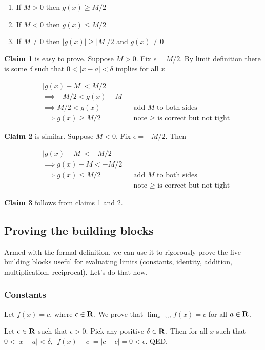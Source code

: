 \begin{enumerate}
    \item If $M>0$ then $g(x)\geq M/2$
    \item If $M<0$ then $g(x)\leq M/2$
    \item If $M\neq 0$ then $|g(x)|\geq|M|/2$ and $g(x)\neq 0$
\end{enumerate}

\textbf{Claim 1} is easy to prove. Suppose $M>0$. Fix $\epsilon=M/2$. By
limit definition there is some $\delta$ such that $0<|x-a|<\delta$ implies for
all $x$

\begin{align*}
    &|g(x)-M|<M/2\\
    &\implies -M/2<g(x)-M\\
    &\implies M/2<g(x)&&\text{add $M$ to both sides}\\
    &\implies g(x)\geq M/2&&\text{note $\geq$ is correct but not tight}
\end{align*}

\textbf{Claim 2} is similar. Suppose $M<0$. Fix $\epsilon=-M/2$. Then

\begin{align*}
    &|g(x)-M|<-M/2\\
    &\implies g(x)-M<-M/2\\
    &\implies g(x)\leq M/2&&\text{add $M$ to both sides}\\
    & &&\text{note $\geq$ is correct but not tight}
\end{align*}

\textbf{Claim 3} follows from claims 1 and 2.

\subsection{Proving the building blocks}

Armed with the formal definition, we can use it to rigorously prove
the five building blocks useful for evaluating limits (constants,
identity, addition, multiplication, reciprocal). Let's do that now.

\subsubsection{Constants}
Let $f(x)=c$, where $c\in\mathbf{R}$. We prove that $\lim_{x\to a}f(x)=c$ for all $a\in\mathbf{R}$.

\vs

Let $\epsilon\in\mathbf{R}$ such that $\epsilon>0$. Pick any positive
$\delta\in\mathbf{R}$. Then for all $x$ such that $0<|x-a|<\delta$,
$|f(x)-c|=|c-c|=0<\epsilon$. QED.

